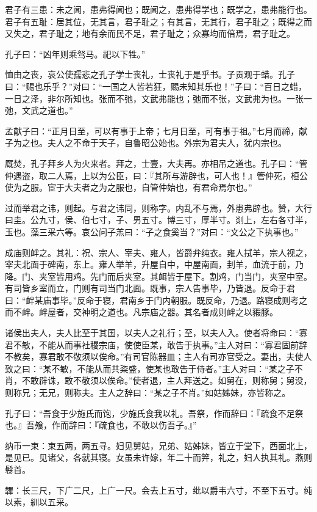 \documentclass[]{article}
\begin{document}
君子有三患：未之闻，患弗得闻也；既闻之，患弗得学也；既学之，患弗能行也。君子有五耻：居其位，无其言，君子耻之；有其言，无其行，君子耻之；既得之而又失之，君子耻之；地有余而民不足，君子耻之；众寡均而倍焉，君子耻之。

孔子曰：``凶年则乘驽马。祀以下牲。''

恤由之丧，哀公使孺悲之孔子学士丧礼，士丧礼于是乎书。子贡观于蜡。孔子曰：``赐也乐乎？''对曰：``一国之人皆若狂，赐未知其乐也！''子曰：``百日之蜡，一日之泽，非尔所知也。张而不弛，文武弗能也；弛而不张，文武弗为也。一张一弛，文武之道也。''

孟献子曰：``正月日至，可以有事于上帝；七月日至，可有事于祖。''七月而禘，献子为之也。夫人之不命于天子，自鲁昭公始也。外宗为君夫人，犹内宗也。

厩焚，孔子拜乡人为火来者。拜之，士壹，大夫再。亦相吊之道也。孔子曰：``管仲遇盗，取二人焉，上以为公臣，曰：『其所与游辟也，可人也！』管仲死，桓公使为之服。宦于大夫者之为之服也，自管仲始也，有君命焉尔也。''

过而举君之讳，则起。与君之讳同，则称字。内乱不与焉，外患弗辟也。赞，大行曰圭。公九寸，侯、伯七寸，子、男五寸。博三寸，厚半寸。剡上，左右各寸半，玉也。藻三采六等。哀公问子羔曰：``子之食奚当？''对曰：``文公之下执事也。''

成庙则衅之。其礼：祝、宗人、宰夫、雍人，皆爵弁纯衣。雍人拭羊，宗人视之，宰夫北面于碑南，东上。雍人举羊，升屋自中，中屋南面，刲羊，血流于前，乃降。门、夹室皆用鸡。先门而后夹室。其衈皆于屋下。割鸡，门当门，夹室中室。有司皆乡室而立，门则有司当门北面。既事，宗人告事毕，乃皆退。反命于君曰：``衅某庙事毕。''反命于寝，君南乡于门内朝服。既反命，乃退。路寝成则考之而不衅。衅屋者，交神明之道也。凡宗庙之器。其名者成则衅之以豭豚。

诸侯出夫人，夫人比至于其国，以夫人之礼行；至，以夫人入。使者将命曰：``寡君不敏，不能从而事社稷宗庙，使使臣某，敢告于执事。''主人对曰：``寡君固前辞不教矣，寡君敢不敬须以俟命。''有司官陈器皿；主人有司亦官受之。妻出，夫使人致之曰：``某不敏，不能从而共粢盛，使某也敢告于侍者。''主人对曰：``某之子不肖，不敢辟诛，敢不敬须以俟命。''使者退，主人拜送之。如舅在，则称舅；舅没，则称兄；无兄，则称夫。主人之辞曰：``某之子不肖。''如姑姊妹，亦皆称之。

孔子曰：``吾食于少施氏而饱，少施氏食我以礼。吾祭，作而辞曰：『疏食不足祭也。』吾飧，作而辞曰：『疏食也，不敢以伤吾子。』''

纳币一束：束五两，两五寻。妇见舅姑，兄弟、姑姊妹，皆立于堂下，西面北上，是见已。见诸父，各就其寝。女虽未许嫁，年二十而笄，礼之，妇人执其礼。燕则鬈首。

韠：长三尺，下广二尺，上广一尺。会去上五寸，纰以爵韦六寸，不至下五寸。纯以素，紃以五采。
\end{document}
